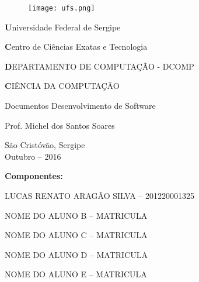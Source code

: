 \begin{titlepage}

\newcommand{\universidade}{Universidade Federal de Sergipe}
\newcommand{\centro}{Centro de Ciências Exatas e Tecnologia}
\newcommand{\departamento}{DEPARTAMENTO DE COMPUTAÇÃO - DCOMP}
\newcommand{\curso}{CIÊNCIA DA COMPUTAÇÃO}

\newcommand{\titulo}{Documentos Desenvolvimento de Software}

\newcommand{\professor}{Prof. Michel dos Santos Soares }

\begin{center}
\begin{figure}[t]
	\centering
	\texttt{[image: ufs.png]}
\end{figure}
{\large \textbf \universidade}
\par
{\large \textbf \centro}
\par
{\large \textbf \departamento}
\par
{\large \textbf \curso}
\par
\vspace{60pt}

{\large \titulo}
\par
\vspace{60pt}

{\large \professor}
\par
\vfill

{\large São Cristóvão, Sergipe}\\
{\large Outubro -- 2016}
\end{center}
\end{titlepage}



\newcommand{\alunoA}{LUCAS RENATO ARAGÃO SILVA -- 201220001325}
\newcommand{\alunoB}{NOME DO ALUNO B -- MATRICULA}
\newcommand{\alunoC}{NOME DO ALUNO C -- MATRICULA}
\newcommand{\alunoD}{NOME DO ALUNO D -- MATRICULA}
\newcommand{\alunoE}{NOME DO ALUNO E -- MATRICULA}

\setcounter{page}{2}

\begin{center}
{\large \textbf {Componentes:}}
\par
\vspace{12pt}
{\normalsize \alunoA}
\par
{\normalsize \alunoB}
\par
{\normalsize \alunoC}
\par
{\normalsize \alunoD}
\par
{\normalsize \alunoE}
\par
\end{center}
\clearpage



\renewcommand{\contentsname}{Conteúdo}
{
	\hypersetup{linkcolor=black}
	\tableofcontents
}

